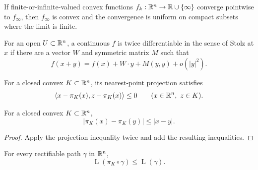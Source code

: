 \begin{lemma}
\label{lem:chow-iii-h6-convex-limits}
If finite-or-infinite-valued convex functions $f_k:\mathbb R^n\to\mathbb R\cup\{\infty\}$ converge
pointwise to $f_\infty$, then $f_\infty$ is convex and the convergence is uniform on
compact subsets where the limit is finite.
\end{lemma}

\begin{definition}
\label{def:chow-iii-h7-stolz-differentiability}
For an open $U\subset\mathbb R^n$, a continuous $f$ is twice differentiable in the sense of
Stolz at $x$ if there are a vector $W$ and symmetric matrix $M$ such that
\[
f(x+y)=f(x)+W\cdot y+M(y,y)+o(|y|^2).
\]
\end{definition}

\begin{lemma}
\label{lem:chow-iii-h8-projection-inequality}
For a closed convex $K\subset\mathbb R^n$, its nearest-point projection satisfies
\[
\langle x-\pi_K(x),z-\pi_K(x)\rangle\le0
\qquad(x\in\mathbb R^n,\ z\in K).
\]
\end{lemma}

\begin{proposition}
\label{prop:chow-iii-h9-projection-contraction}
For a closed convex $K\subset\mathbb R^n$,
\[
|\pi_K(x)-\pi_K(y)|\le |x-y|.
\]
\end{proposition}
\begin{proof}
\sketch
Apply the projection inequality twice and add the resulting inequalities.
\end{proof}

\begin{corollary}
\label{cor:chow-iii-h10-projection-length}
For every rectifiable path $\gamma$ in $\mathbb R^n$,
\[
\operatorname{L}(\pi_K\circ\gamma)\le \operatorname{L}(\gamma).
\]
\end{corollary}

